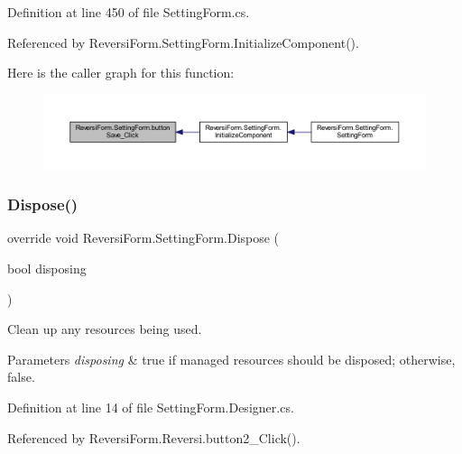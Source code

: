 Definition at line 450 of file Setting\+Form.\+cs.



Referenced by Reversi\+Form.\+Setting\+Form.\+Initialize\+Component().

Here is the caller graph for this function\+:
\nopagebreak
\begin{figure}[H]
\begin{center}
\leavevmode
\includegraphics[width=350pt]{class_reversi_form_1_1_setting_form_aba7b2ad370dba451133448e702cf0944_icgraph}
\end{center}
\end{figure}
\mbox{\label{class_reversi_form_1_1_setting_form_ab4be09946d93ed193820f8d7acfc2cb5}} 
\subsubsection{\texorpdfstring{Dispose()}{Dispose()}}
{\footnotesize\ttfamily override void Reversi\+Form.\+Setting\+Form.\+Dispose (\begin{DoxyParamCaption}\item[{bool}]{disposing }\end{DoxyParamCaption})\hspace{0.3cm}{\ttfamily [protected]}}



Clean up any resources being used. 


\begin{DoxyParams}{Parameters}
{\em disposing} & true if managed resources should be disposed; otherwise, false.\\
\hline
\end{DoxyParams}


Definition at line 14 of file Setting\+Form.\+Designer.\+cs.



Referenced by Reversi\+Form.\+Reversi.\+button2\+\_\+\+Click().

